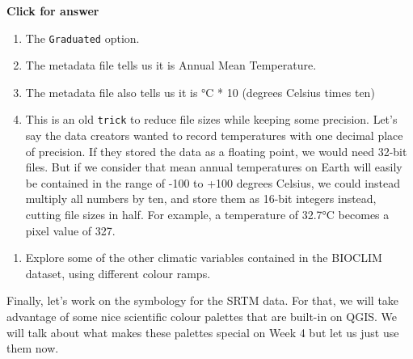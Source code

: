\documentclass[
  letterpaper,
  DIV=11,
  numbers=noendperiod]{scrreprt}
\providecommand{\tightlist}{%
  \setlength{\itemsep}{0pt}\setlength{\parskip}{0pt}}\usepackage{longtable,booktabs,array}
\begin{document}
\begin{tcolorbox}[enhanced jigsaw, toprule=.15mm, breakable, left=2mm, colframe=quarto-callout-important-color-frame, colback=white, arc=.35mm, leftrule=.75mm, opacityback=0, rightrule=.15mm, bottomrule=.15mm]

\vspace{-3mm}\textbf{Click for answer}\vspace{3mm}

\begin{enumerate}
\def\labelenumi{\alph{enumi})}
\item
  The \texttt{Graduated} option.
\item
  The metadata file tells us it is Annual Mean Temperature.
\item
  The metadata file also tells us it is °C * 10 (degrees Celsius times
  ten)
\item
  This is an old \texttt{trick} to reduce file sizes while keeping some
  precision. Let's say the data creators wanted to record temperatures
  with one decimal place of precision. If they stored the data as a
  floating point, we would need 32-bit files. But if we consider that
  mean annual temperatures on Earth will easily be contained in the
  range of -100 to +100 degrees Celsius, we could instead multiply all
  numbers by ten, and store them as 16-bit integers instead, cutting
  file sizes in half. For example, a temperature of 32.7°C becomes a
  pixel value of 327.
\end{enumerate}

\end{tcolorbox}

\begin{enumerate}
\def\labelenumi{(\arabic{enumi})}
\setcounter{enumi}{139}
\tightlist
\item
  Explore some of the other climatic variables contained in the BIOCLIM
  dataset, using different colour ramps.
\end{enumerate}

Finally, let's work on the symbology for the SRTM data. For that, we
will take advantage of some nice scientific colour palettes that are
built-in on QGIS. We will talk about what makes these palettes special
on Week 4 but let us just use them now.
\end{document}
